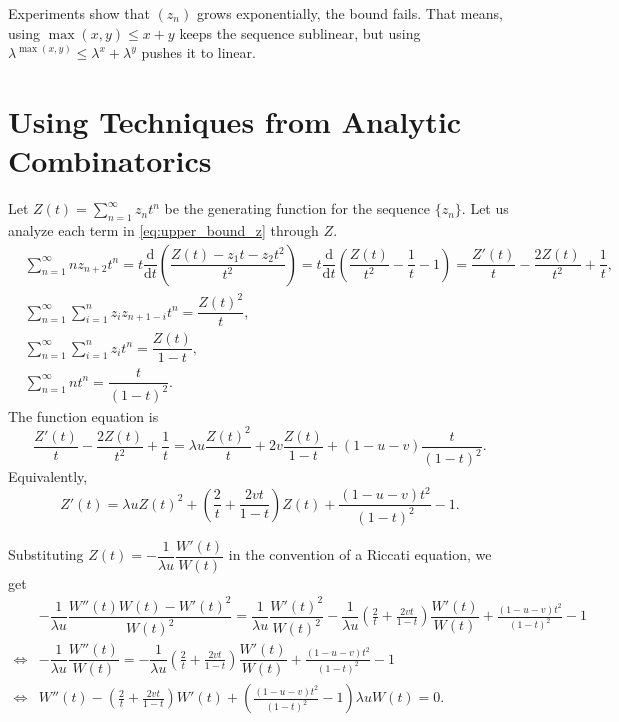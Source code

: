 Experiments show that $(z_n)$ grows exponentially, the bound fails. That means, using $\max(x,y) \le x+y$ keeps the sequence sublinear, but using $\lambda^{\max(x,y)} \le \lambda^x + \lambda^y$ pushes it to linear.


\section{Using Techniques from Analytic Combinatorics}
Let $Z(t) = \sum_{n=1}^\infty z_n t^n$ be the generating function for the sequence $\{z_n\}$. Let us analyze each term in \eqref{eq:upper_bound_z} through $Z$.
\begin{align*}
   & \sum\limits_{n=1}^\infty nz_{n+2}t^n
  = t\dfrac{\mathrm{d}}{\mathrm{d}t}\left(\dfrac{Z(t) - z_1t - z_2t^2}{t^2}\right) = t\dfrac{\mathrm{d}}{\mathrm{d}t}\left(\dfrac{Z(t)}{t^2} - \dfrac{1}{t} - 1\right) = \dfrac{Z'(t)}{t} - \dfrac{2Z(t)}{t^2} + \dfrac{1}{t}, \\
   & \sum\limits_{n=1}^\infty \sum\limits_{i=1}^n z_iz_{n+1-i}t^n
  = \dfrac{Z(t)^2}{t},                                                                                                                                                                                                         \\
   & \sum\limits_{n=1}^\infty \sum\limits_{i=1}^n z_it^n = \dfrac{Z(t)}{1-t},                                                                                                                                                  \\
   & \sum\limits_{n=1}^\infty nt^n = \dfrac{t}{(1-t)^2}.
\end{align*}
The function equation is
$$\dfrac{Z'(t)}{t} - \dfrac{2Z(t)}{t^2} + \dfrac{1}{t} = \lambda u\dfrac{Z(t)^2}{t} + 2v\dfrac{Z(t)}{1-t} + (1-u-v)\dfrac{t}{(1-t)^2}.$$
Equivalently,
\begin{equation}
  Z'(t) = \lambda u Z(t)^2 + \left( \frac{2}{t} + \frac{2v t}{1-t} \right) Z(t) + \frac{(1-u-v) t^2}{(1-t)^2} - 1.
\end{equation}

Substituting $Z(t) = -\dfrac{1}{\lambda u} \dfrac{W'(t)}{W(t)}$ in the convention of a Riccati equation, we get
\begin{align*}
       & -\dfrac{1}{\lambda u}\dfrac{W''(t)W(t)-W'(t)^2}{W(t)^2} = \dfrac{1}{\lambda u} \dfrac{W'(t)^2}{W(t)^2} - \dfrac{1}{\lambda u} \left( \frac{2}{t} + \frac{2v t}{1-t} \right) \dfrac{W'(t)}{W(t)} + \frac{(1-u-v) t^2}{(1-t)^2} - 1 \\
  \iff & -\dfrac{1}{\lambda u}\dfrac{W''(t)}{W(t)} = - \dfrac{1}{\lambda u} \left( \frac{2}{t} + \frac{2v t}{1-t} \right) \dfrac{W'(t)}{W(t)} + \frac{(1-u-v) t^2}{(1-t)^2} - 1                                                            \\
  \iff & W''(t) - \left( \frac{2}{t} + \frac{2v t}{1-t} \right) W'(t) + \left(\frac{(1-u-v) t^2}{(1-t)^2} - 1\right)\lambda u W(t) = 0.
\end{align*}
